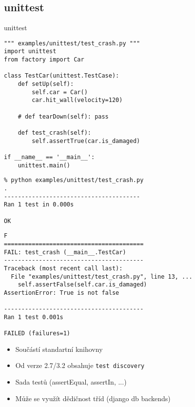 \subsection{unittest}

\begin{frame}
\begin{center}
\huge{unittest}
\end{center}
\end{frame}

\begin{frame}[fragile]
\begin{verbatim}
""" examples/unittest/test_crash.py """
import unittest
from factory import Car

class TestCar(unittest.TestCase):
    def setUp(self):
        self.car = Car()
        car.hit_wall(velocity=120)

    # def tearDown(self): pass

    def test_crash(self):
        self.assertTrue(car.is_damaged)

if __name__ == '__main__':
    unittest.main()

\end{verbatim}
\end{frame}

\begin{frame}[fragile]
\begin{verbatim}
% python examples/unittest/test_crash.py
.
---------------------------------------
Ran 1 test in 0.000s

OK

\end{verbatim}
\end{frame}

\begin{frame}[fragile]
\begin{verbatim}
F
========================================
FAIL: test_crash (__main__.TestCar)
----------------------------------------
Traceback (most recent call last):
  File "examples/unittest/test_crash.py", line 13, ...
    self.assertFalse(self.car.is_damaged)
AssertionError: True is not false

----------------------------------------
Ran 1 test 0.001s

FAILED (failures=1)
\end{verbatim}
\end{frame}

\begin{frame}
\begin{itemize}[<+->]
\item Součástí standartní knihovny
\item Od verze 2.7/3.2 obsahuje {\tt test discovery}
\item Sada testů (assertEqual, assertIn, ...)
\item Může se využít dědičnost tříd (django db backends)
\end{itemize}
\end{frame}

